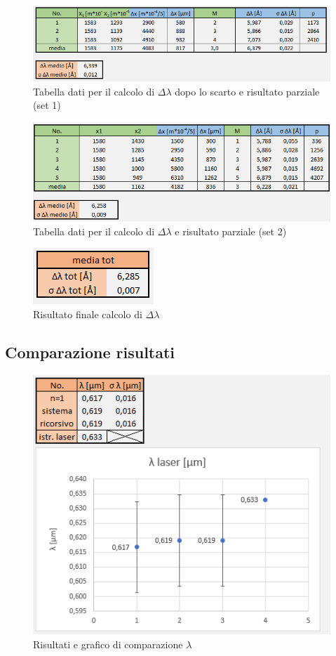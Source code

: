 \documentclass{article}
\begin{document}
\begin{figure}[h!]
  \centering
  \includegraphics[width=0.75\linewidth]{IM tabella delta lambda set 1 scarto}
  \caption{Tabella dati per il calcolo di $\Delta\lambda$ dopo lo scarto e risultato parziale (set 1)}
\end{figure}

\begin{figure}[h!]
  \centering
  \includegraphics[width=0.75\linewidth]{IM tabella delta lambda set 2}
  \caption{Tabella dati per il calcolo di $\Delta\lambda$ e risultato parziale (set 2)}
\end{figure}

\begin{figure}[h!]
  \centering
  \includegraphics[width=0.25\linewidth]{IM risultati delta lambda}
  \caption{Risultato finale calcolo di $\Delta\lambda$}
\end{figure}

\pagebreak

\subsection{Comparazione risultati}

\begin{figure}[h!]
  \centering
  \includegraphics[width=0.6\linewidth]{IM comparazione lambda}
  \caption{Risultati e grafico di comparazione $\lambda$}
\end{figure}
\end{document}
